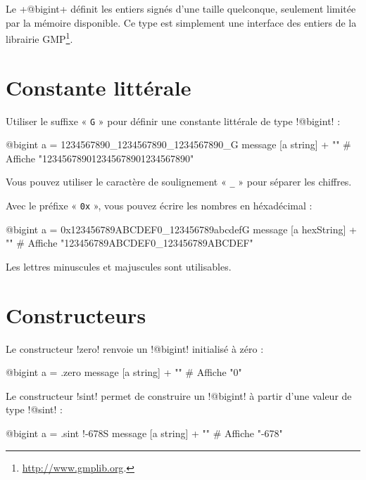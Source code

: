 

Le \ggs+@bigint+ définit les entiers signés d'une taille quelconque, seulement limitée par la mémoire disponible. Ce type est simplement une interface des entiers de la librairie GMP\footnote{\url{http://www.gmplib.org}.}.

\section{Constante littérale}

Utiliser le suffixe « \texttt{G} » pour définir une constante littérale de type \ggs!@bigint! :
\begin{galgas}
@bigint a = 1234567890_1234567890_1234567890_G
message [a string] + "\n" # Affiche "123456789012345678901234567890"
\end{galgas}

Vous pouvez utiliser le caractère de soulignement « \texttt{\_} » pour séparer les chiffres.

Avec le préfixe « \texttt{0x} », vous pouvez écrire les nombres en héxadécimal :
\begin{galgas}
@bigint a = 0x123456789ABCDEF0_123456789abcdefG
message [a hexString] + "\n" # Affiche "123456789ABCDEF0_123456789ABCDEF"
\end{galgas}

Les lettres minuscules et majuscules sont utilisables.

\section{Constructeurs}


Le constructeur \ggs!zero! renvoie un \ggs!@bigint! initialisé à zéro :
\begin{galgas}
@bigint a = .zero
message [a string] + "\n" # Affiche "0"
\end{galgas}



Le constructeur \ggs!sint! permet de construire un \ggs!@bigint! à partir d'une valeur de type \ggs!@sint! :
\begin{galgas}
@bigint a = .sint {!-678S}
message [a string] + "\n" # Affiche "-678"
\end{galgas}


